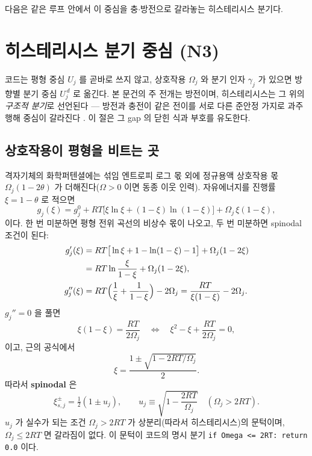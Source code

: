 \documentclass[11pt,a4paper]{article}
\newcommand{\code}[1]{\texttt{#1}}
\begin{document}
다음은 같은 루프 안에서 이 중심을 충$\cdot$방전으로 갈라놓는 히스테리시스 분기다.

\section{히스테리시스 분기 중심 (N3)}\label{sec:hys}
코드는 평형 중심 $U_j$ 를 곧바로 쓰지 않고, 상호작용 $\Omega_j$ 와 분기 인자 $\gamma_j$ 가 있으면 방향별 분기 중심
$U_j^{\,d}$ 로 옮긴다. 본 문건의 주 전개는 방전이며, 히스테리시스는 그 위의 \emph{구조적 분기}로 선언된다 — 방전과 충전이
같은 전이를 서로 다른 준안정 가지로 과주행해 중심이 갈라진다 \cite{dreyer2010}. 이 절은 그 gap 의 닫힌 식과 부호를 유도한다.

\subsection{상호작용이 평형을 비트는 곳}
격자기체의 화학퍼텐셜에는 섞임 엔트로피 로그 몫 외에 정규용액 상호작용 몫 $\Omega_j(1-2\theta)$ 가 더해진다($\Omega>0$
이면 동종 이웃 인력). 자유에너지를 진행률 $\xi=1-\theta$ 로 적으면
\begin{equation}
g_j(\xi)=g_j^0+RT\big[\xi\ln\xi+(1-\xi)\ln(1-\xi)\big]+\Omega_j\,\xi(1-\xi),
\label{eq:gxi}
\end{equation}
이다. 한 번 미분하면 평형 전위 곡선의 비상수 몫이 나오고, 두 번 미분하면 spinodal 조건이 된다:
\begin{align}
g_j'(\xi)
&=RT\big[\ln\xi+1-\ln(1-\xi)-1\big]+\Omega_j(1-2\xi)\notag\\
&=RT\ln\frac{\xi}{1-\xi}+\Omega_j(1-2\xi),
\label{eq:gprime_v809}\\
g_j''(\xi)
&=RT\Big(\frac{1}{\xi}+\frac{1}{1-\xi}\Big)-2\Omega_j
=\frac{RT}{\xi(1-\xi)}-2\Omega_j.
\label{eq:gpp_v809}
\end{align}
$g_j''=0$ 을 풀면
\begin{equation}
\xi(1-\xi)=\frac{RT}{2\Omega_j}
\quad\Longleftrightarrow\quad
\xi^2-\xi+\frac{RT}{2\Omega_j}=0,
\label{eq:spinodal_quad}
\end{equation}
이고, 근의 공식에서
\begin{equation}
\xi=\frac{1\pm\sqrt{1-2RT/\Omega_j}}{2}.
\label{eq:spinodal_formula}
\end{equation}
따라서 \textbf{spinodal} 은
\begin{equation}
\xi_{s,j}^\pm=\tfrac12(1\pm u_j),\qquad
u_j\equiv\sqrt{1-\frac{2RT}{\Omega_j}}\quad(\Omega_j>2RT).
\label{eq:spinodal}
\end{equation}
$u_j$ 가 실수가 되는 조건 $\Omega_j>2RT$ 가 상분리(따라서 히스테리시스)의 문턱이며, $\Omega_j\le2RT$ 면 갈라짐이 없다.
이 문턱이 코드의 명시 분기 \code{if Omega <= 2RT: return 0.0} 이다.
\end{document}

